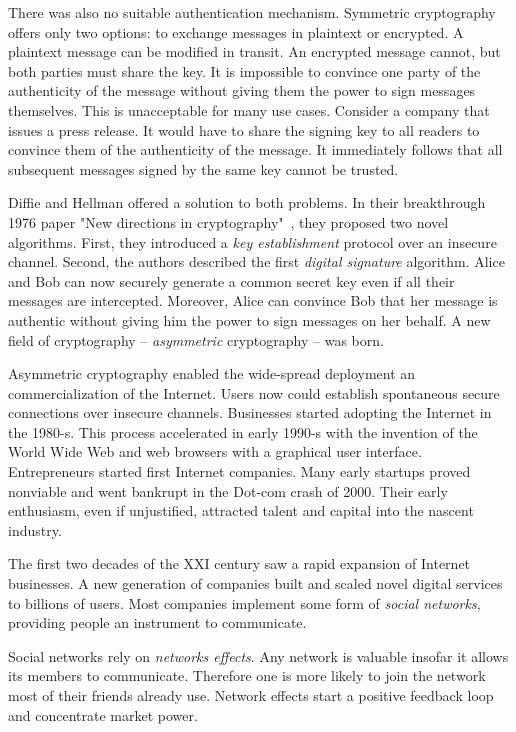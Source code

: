 There was also no suitable authentication mechanism.
Symmetric cryptography offers only two options: to exchange messages in plaintext or encrypted.
A plaintext message can be modified in transit.
An encrypted message cannot, but both parties must share the key.
It is impossible to convince one party of the authenticity of the message without giving them the power to sign messages themselves.
This is unacceptable for many use cases.
Consider a company that issues a press release.
It would have to share the signing key to all readers to convince them of the authenticity of the message.
It immediately follows that all subsequent messages signed by the same key cannot be trusted.

Diffie and Hellman offered a solution to both problems.
In their breakthrough 1976 paper "New directions in cryptography"~\cite{Diffie1976}, they proposed two novel algorithms.
First, they introduced a \textit{key establishment} protocol over an insecure channel.
Second, the authors described the first \textit{digital signature} algorithm.
Alice and Bob can now securely generate a common secret key even if all their messages are intercepted.
Moreover, Alice can convince Bob that her message is authentic without giving him the power to sign messages on her behalf.
A new field of cryptography -- \textit{asymmetric} cryptography -- was born.

Asymmetric cryptography enabled the wide-spread deployment an commercialization of the Internet.
Users now could establish spontaneous secure connections over insecure channels.
Businesses started adopting the Internet in the 1980-s.
This process accelerated in early 1990-s with the invention of the World Wide Web and web browsers with a graphical user interface.
Entrepreneurs started first Internet companies.
Many early startups proved nonviable and went bankrupt in the Dot-com crash of 2000.
Their early enthusiasm, even if unjustified, attracted talent and capital into the nascent industry.

The first two decades of the XXI century saw a rapid expansion of Internet businesses.
A new generation of companies built and scaled novel digital services to billions of users.
Most companies implement some form of \textit{social networks}, providing people an instrument to communicate.

Social networks rely on \textit{networks effects}.
Any network is valuable insofar it allows its members to communicate.
Therefore one is more likely to join the network most of their friends already use.
Network effects start a positive feedback loop and concentrate market power.

